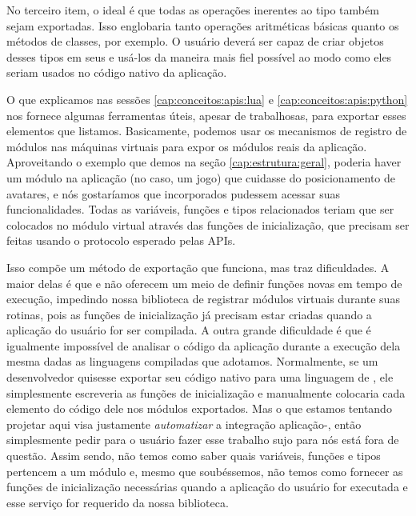     No terceiro item, o ideal é que todas as operações inerentes ao tipo
    também sejam exportadas. Isso englobaria tanto operações aritméticas básicas
    quanto os métodos de classes, por exemplo. O usuário deverá ser capaz de
    criar objetos desses tipos em seus  e usá-los da maneira mais fiel
    possível ao modo como eles seriam usados no código nativo da aplicação.

    O que explicamos nas sessões \ref{cap:conceitos:apis:lua} e
    \ref{cap:conceitos:apis:python} nos fornece algumas ferramentas úteis,
    apesar de trabalhosas, para exportar esses elementos que listamos.
    Basicamente, podemos usar os mecanismos de registro de módulos nas máquinas
    virtuais para expor os módulos reais da aplicação\footnotemark{}. Aproveitando
    o exemplo que demos na seção \ref{cap:estrutura:geral}, poderia haver um
    módulo na aplicação (no caso, um jogo) que cuidasse do posicionamento de
    avatares, e nós gostaríamos que  incorporados pudessem acessar
    suas funcionalidades. Todas as variáveis, funções e tipos relacionados
    teriam que ser colocados no módulo virtual através das funções de
    inicialização, que precisam ser feitas usando o protocolo esperado pelas
    APIs.


    Isso compõe um método de exportação que funciona, mas traz dificuldades. A
    maior delas é que \C{} e \CXX{} não oferecem um meio de definir funções
    novas em tempo de execução, impedindo nossa biblioteca de registrar módulos
    virtuais durante suas rotinas, pois as funções de inicialização já precisam
    estar criadas quando a aplicação do usuário for ser compilada. A outra
    grande dificuldade é que é igualmente impossível de analisar o código da
    aplicação durante a execução dela mesma dadas as linguagens compiladas que
    adotamos. Normalmente, se um desenvolvedor quisesse exportar seu código
    nativo para uma linguagem de \script{}, ele simplesmente escreveria as
    funções de inicialização e manualmente colocaria cada elemento do código
    dele nos módulos exportados. Mas o que estamos tentando projetar aqui visa
    justamente \emph{automatizar} a integração aplicação-, então
    simplesmente pedir para o usuário fazer esse trabalho sujo para nós está
    fora de questão. Assim sendo, não temos como saber quais variáveis, funções
    e tipos pertencem a um módulo e, mesmo que soubéssemos, não temos como
    fornecer as funções de inicialização necessárias quando a aplicação do
    usuário for executada e esse serviço for requerido da nossa biblioteca.
    
